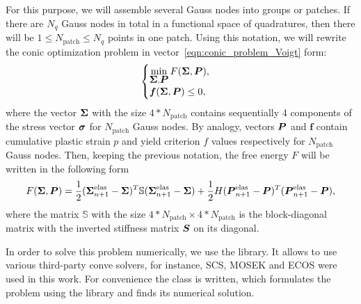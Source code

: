 \documentclass[12pt]{article}
\begin{document}
For this purpose, we will assemble several Gauss nodes into groups or patches. If there are $N_q$ Gauss nodes in total in a functional space of quadratures, then there will be $1 \leq N_\text{patch} \leq N_q$ points in one patch. Using this notation, we will rewrite the conic optimization problem in vector~\eqref{eqn:conic_problem_Voigt} form:
\begin{equation}
    \label{eqn:conic_problem_vectorized}
    \begin{cases}
        \min\limits_{\mbox{\boldmath $\Sigma$}, \mbox{\boldmath $P$}} F(\mbox{\boldmath $\Sigma$}, \mbox{\boldmath $P$}), \\
        \mbox{\boldmath $f$}(\mbox{\boldmath $\Sigma$}, \mbox{\boldmath $P$}) \leq 0,
    \end{cases}
\end{equation}
where the vector $\mbox{\boldmath $\Sigma$}$ with the size $4*N_\text{patch}$ contains sequentially 4 components of the stress vector $\mbox{\boldmath$\sigma$}$ for $N_\text{patch}$ Gauss nodes. By analogy, vectors $\mbox{\boldmath $P$}$ and $\mathbold{f}$ contain cumulative plastic strain $p$ and yield criterion $f$ values respectively for $N_\text{patch}$ Gauss nodes. Then, keeping the previous notation, the free energy $F$ will be written in the following form 
\begin{equation}
    F(\mbox{\boldmath $\Sigma$}, \mbox{\boldmath $P$}) = \frac{1}{2}(\mbox{\boldmath $\Sigma$}_{n+1}^\text{elas} - \mbox{\boldmath $\Sigma$})^T \mathbb{S} (\mbox{\boldmath $\Sigma$}_{n+1}^\text{elas} - \mbox{\boldmath $\Sigma$}) + \frac{1}{2}H(\mbox{\boldmath $P$}_{n+1}^\text{elas} - \mbox{\boldmath $P$})^T(\mbox{\boldmath $P$}_{n+1}^\text{elas} - \mbox{\boldmath $P$}),
\end{equation}
where the matrix $\mathbb{S}$ with the size $4*N_\text{patch}\times4*N_\text{patch}$ is the block-diagonal matrix with the inverted stiffness matrix $\mbox{\boldmath $S$}$ on its diagonal.

In order to solve this problem numerically, we use the  library. It allows to use various third-party conve solvers, for instance, SCS, MOSEK and ECOS were used in this work. For convenience the  class is written, which formulates the problem using the  library and finds its numerical solution.
\end{document}
